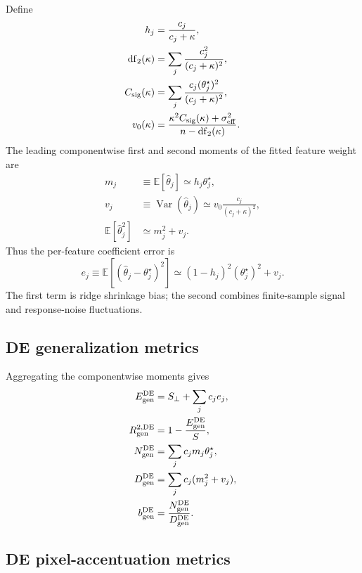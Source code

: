 \documentclass[11pt]{article}
\newcommand{\E}{\mathbb{E}}
\newcommand{\Var}{\operatorname{Var}}
\begin{document}
Define
\begin{align}
  h_j&=\frac{c_j}{c_j+\kappa},\\
  \mathrm{df}_2(\kappa)&=\sum_j\frac{c_j^2}{(c_j+\kappa)^2},\\
  C_{\rm sig}(\kappa)&=
       \sum_j\frac{c_j(\theta_j^{\star})^2}{(c_j+\kappa)^2},\\
  v_0(\kappa)&=
       \frac{\kappa^2C_{\rm sig}(\kappa)+\sigma_{\rm eff}^2}
            {n-\mathrm{df}_2(\kappa)}.
  \label{eq:de-global-quantities}
\end{align}
The leading componentwise first and second moments of the fitted feature
weight are
\begin{align}
  m_j&\equiv\E[\widehat\theta_j]
       \simeq h_j\theta_j^{\star},\\
  v_j&\equiv\Var(\widehat\theta_j)
       \simeq v_0\frac{c_j}{(c_j+\kappa)^2},\\
  \E[\widehat\theta_j^2]&\simeq m_j^2+v_j.
  \label{eq:de-component-moments}
\end{align}
Thus the per-feature coefficient error is
\begin{equation}
  e_j\equiv\E[(\widehat\theta_j-\theta_j^{\star})^2]
  \simeq (1-h_j)^2(\theta_j^{\star})^2+v_j.
  \label{eq:de-per-feature-error}
\end{equation}
The first term is ridge shrinkage bias; the second combines finite-sample
signal and response-noise fluctuations.

\subsection{DE generalization metrics}

Aggregating the componentwise moments gives
\begin{align}
  E_{\rm gen}^{\rm DE}
    &=S_{\perp}+\sum_j c_je_j,
    \label{eq:de-gen-error}\\
  R_{\rm gen}^{2,\rm DE}
    &=1-\frac{E_{\rm gen}^{\rm DE}}{S},\\
  N_{\rm gen}^{\rm DE}
    &=\sum_j c_jm_j\theta_j^{\star},\\
  D_{\rm gen}^{\rm DE}
    &=\sum_j c_j(m_j^2+v_j),\\
  b_{\rm gen}^{\rm DE}
    &=\frac{N_{\rm gen}^{\rm DE}}{D_{\rm gen}^{\rm DE}}.
  \label{eq:de-gen-slope}
\end{align}

\subsection{DE pixel-accentuation metrics}
\end{document}
